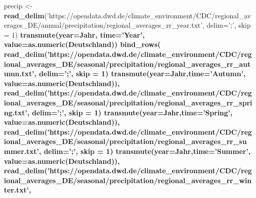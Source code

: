 \documentclass[
]{article}
\newenvironment{Shaded}{\begin{snugshade}}{\end{snugshade}}
\newcommand{\DataTypeTok}[1]{\textcolor[rgb]{0.13,0.29,0.53}{#1}}
\newcommand{\DecValTok}[1]{\textcolor[rgb]{0.00,0.00,0.81}{#1}}
\newcommand{\KeywordTok}[1]{\textcolor[rgb]{0.13,0.29,0.53}{\textbf{#1}}}
\newcommand{\NormalTok}[1]{#1}
\newcommand{\OperatorTok}[1]{\textcolor[rgb]{0.81,0.36,0.00}{\textbf{#1}}}
\newcommand{\StringTok}[1]{\textcolor[rgb]{0.31,0.60,0.02}{#1}}
\begin{document}
\begin{Shaded}
\begin{Highlighting}[]
\NormalTok{precip <-}\StringTok{ }\KeywordTok{read_delim}\NormalTok{(}\StringTok{'https://opendata.dwd.de/climate_environment/CDC/regional_averages_DE/annual/precipitation/regional_averages_rr_year.txt'}\NormalTok{,}
                     \DataTypeTok{delim=}\StringTok{';'}\NormalTok{, }\DataTypeTok{skip =} \DecValTok{1}\NormalTok{) }\OperatorTok{%
\StringTok{  }\KeywordTok{transmute}\NormalTok{(}\DataTypeTok{year=}\NormalTok{Jahr, }\DataTypeTok{time=}\StringTok{'Year'}\NormalTok{, }\DataTypeTok{value=}\KeywordTok{as.numeric}\NormalTok{(Deutschland)) }\OperatorTok{%
\StringTok{  }\KeywordTok{bind_rows}\NormalTok{(}
    \KeywordTok{read_delim}\NormalTok{(}\StringTok{'https://opendata.dwd.de/climate_environment/CDC/regional_averages_DE/seasonal/precipitation/regional_averages_rr_autumn.txt'}\NormalTok{,}
               \DataTypeTok{delim=}\StringTok{';'}\NormalTok{, }\DataTypeTok{skip =} \DecValTok{1}\NormalTok{) }\OperatorTok{%
\StringTok{      }\KeywordTok{transmute}\NormalTok{(}\DataTypeTok{year=}\NormalTok{Jahr,}\DataTypeTok{time=}\StringTok{'Autumn'}\NormalTok{, }\DataTypeTok{value=}\KeywordTok{as.numeric}\NormalTok{(Deutschland)),}
    \KeywordTok{read_delim}\NormalTok{(}\StringTok{'https://opendata.dwd.de/climate_environment/CDC/regional_averages_DE/seasonal/precipitation/regional_averages_rr_spring.txt'}\NormalTok{,}
               \DataTypeTok{delim=}\StringTok{';'}\NormalTok{, }\DataTypeTok{skip =} \DecValTok{1}\NormalTok{) }\OperatorTok{%
\StringTok{      }\KeywordTok{transmute}\NormalTok{(}\DataTypeTok{year=}\NormalTok{Jahr,}\DataTypeTok{time=}\StringTok{'Spring'}\NormalTok{, }\DataTypeTok{value=}\KeywordTok{as.numeric}\NormalTok{(Deutschland)),}
    \KeywordTok{read_delim}\NormalTok{(}\StringTok{'https://opendata.dwd.de/climate_environment/CDC/regional_averages_DE/seasonal/precipitation/regional_averages_rr_summer.txt'}\NormalTok{,}
               \DataTypeTok{delim=}\StringTok{';'}\NormalTok{, }\DataTypeTok{skip =} \DecValTok{1}\NormalTok{) }\OperatorTok{%
\StringTok{      }\KeywordTok{transmute}\NormalTok{(}\DataTypeTok{year=}\NormalTok{Jahr,}\DataTypeTok{time=}\StringTok{'Summer'}\NormalTok{, }\DataTypeTok{value=}\KeywordTok{as.numeric}\NormalTok{(Deutschland)),}
    \KeywordTok{read_delim}\NormalTok{(}\StringTok{'https://opendata.dwd.de/climate_environment/CDC/regional_averages_DE/seasonal/precipitation/regional_averages_rr_winter.txt'}\NormalTok{,}
}}}}}
\end{Highlighting}
\end{Shaded}
\end{document}
